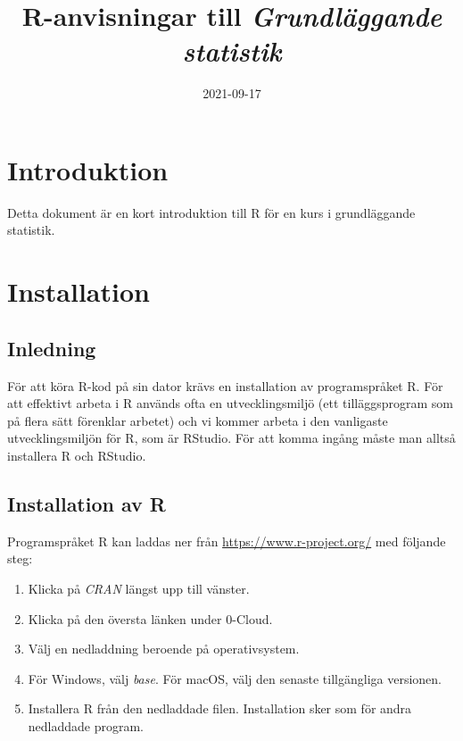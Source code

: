 \documentclass[
]{book}
\title{R-anvisningar till \emph{Grundläggande statistik}}
\author{}
\date{\vspace{-2.5em}2021-09-17}
\providecommand{\tightlist}{%
  \setlength{\itemsep}{0pt}\setlength{\parskip}{0pt}}
\theoremstyle{definition}
\theoremstyle{definition}
\theoremstyle{definition}
\theoremstyle{definition}
\theoremstyle{remark}
\begin{document}
\maketitle

{
\setcounter{tocdepth}{1}
\tableofcontents
}
\hypertarget{introduktion}{%
\chapter{Introduktion}\label{introduktion}}

Detta dokument är en kort introduktion till R för en kurs i grundläggande statistik.

\hypertarget{installation}{%
\chapter{Installation}\label{installation}}

\hypertarget{inledning}{%
\section{Inledning}\label{inledning}}

För att köra R-kod på sin dator krävs en installation av programspråket R. För att effektivt arbeta i R används ofta en utvecklingsmiljö (ett tilläggsprogram som på flera sätt förenklar arbetet) och vi kommer arbeta i den vanligaste utvecklingsmiljön för R, som är RStudio. För att komma ingång måste man alltså installera R och RStudio.

\hypertarget{installation-av-r}{%
\section{Installation av R}\label{installation-av-r}}

Programspråket R kan laddas ner från \url{https://www.r-project.org/} med följande steg:

\begin{enumerate}
\def\labelenumi{\arabic{enumi}.}
\tightlist
\item
  Klicka på \emph{CRAN} längst upp till vänster.
\item
  Klicka på den översta länken under 0-Cloud.
\item
  Välj en nedladdning beroende på operativsystem.
\item
  För Windows, välj \emph{base}. För macOS, välj den senaste tillgängliga versionen.
\item
  Installera R från den nedladdade filen. Installation sker som för andra nedladdade program.
\end{enumerate}
\end{document}
